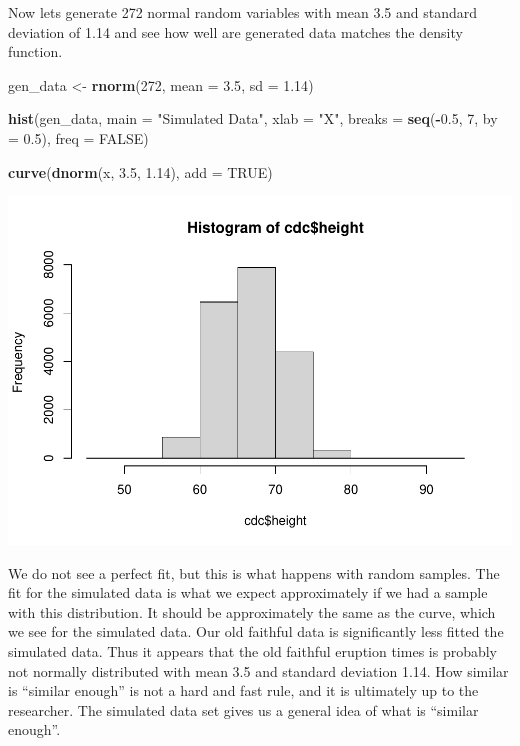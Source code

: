 \documentclass[
]{book}
\newenvironment{Shaded}{\begin{snugshade}}{\end{snugshade}}
\newcommand{\DataTypeTok}[1]{\textcolor[rgb]{0.13,0.29,0.53}{#1}}
\newcommand{\DecValTok}[1]{\textcolor[rgb]{0.00,0.00,0.81}{#1}}
\newcommand{\FloatTok}[1]{\textcolor[rgb]{0.00,0.00,0.81}{#1}}
\newcommand{\KeywordTok}[1]{\textcolor[rgb]{0.13,0.29,0.53}{\textbf{#1}}}
\newcommand{\NormalTok}[1]{#1}
\newcommand{\OperatorTok}[1]{\textcolor[rgb]{0.81,0.36,0.00}{\textbf{#1}}}
\newcommand{\OtherTok}[1]{\textcolor[rgb]{0.56,0.35,0.01}{#1}}
\newcommand{\StringTok}[1]{\textcolor[rgb]{0.31,0.60,0.02}{#1}}
\begin{document}
Now lets generate 272 normal random variables with mean 3.5 and standard deviation of 1.14 and see how well are generated data matches the density function.

\begin{Shaded}
\begin{Highlighting}[]
\NormalTok{gen_data <-}\StringTok{ }\KeywordTok{rnorm}\NormalTok{(}\DecValTok{272}\NormalTok{, }\DataTypeTok{mean =} \FloatTok{3.5}\NormalTok{, }\DataTypeTok{sd =} \FloatTok{1.14}\NormalTok{)}

\KeywordTok{hist}\NormalTok{(gen_data, }\DataTypeTok{main =} \StringTok{"Simulated Data"}\NormalTok{, }\DataTypeTok{xlab =} \StringTok{"X"}\NormalTok{, }\DataTypeTok{breaks =} \KeywordTok{seq}\NormalTok{(}\OperatorTok{-}\FloatTok{0.5}\NormalTok{,}
    \DecValTok{7}\NormalTok{, }\DataTypeTok{by =} \FloatTok{0.5}\NormalTok{), }\DataTypeTok{freq =} \OtherTok{FALSE}\NormalTok{)}

\KeywordTok{curve}\NormalTok{(}\KeywordTok{dnorm}\NormalTok{(x, }\FloatTok{3.5}\NormalTok{, }\FloatTok{1.14}\NormalTok{), }\DataTypeTok{add =} \OtherTok{TRUE}\NormalTok{)}
\end{Highlighting}
\end{Shaded}

\includegraphics{_main_files/figure-latex/unnamed-chunk-223-1.pdf}

We do not see a perfect fit, but this is what happens with random samples. The fit for the simulated data is what we expect approximately if we had a sample with this distribution. It should be approximately the same as the curve, which we see for the simulated data. Our old faithful data is significantly less fitted the simulated data. Thus it appears that the old faithful eruption times is probably not normally distributed with mean 3.5 and standard deviation 1.14. How similar is ``similar enough'' is not a hard and fast rule, and it is ultimately up to the researcher. The simulated data set gives us a general idea of what is ``similar enough''.
\end{document}
